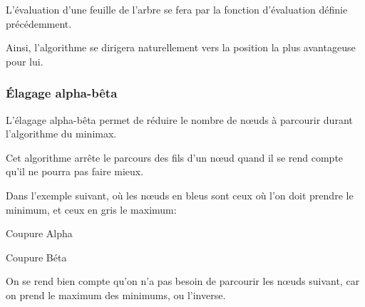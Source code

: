 L'évaluation d'une feuille de l'arbre se fera par la fonction
d'évaluation définie précédemment.

Ainsi, l'algorithme se dirigera naturellement vers la position la plus
avantageuse pour lui.

\subsubsection{Élagage alpha-bêta}
L'élagage alpha-bêta permet de réduire le nombre de nœuds à parcourir durant
l'algorithme du minimax.

Cet algorithme arrête le parcours des fils d'un nœud quand il se rend
compte qu'il ne pourra pas faire mieux.

Dans l'exemple suivant, où les nœuds en bleus sont ceux où l'on doit prendre
le minimum, et ceux en gris le maximum:
\begin{multicols}{2}\begin{center}

  Coupure Alpha


  Coupure Béta
\end{center}\end{multicols}

On se rend bien compte qu'on n'a pas besoin de parcourir les nœuds suivant,
car on prend le maximum des minimums, ou l'inverse.

